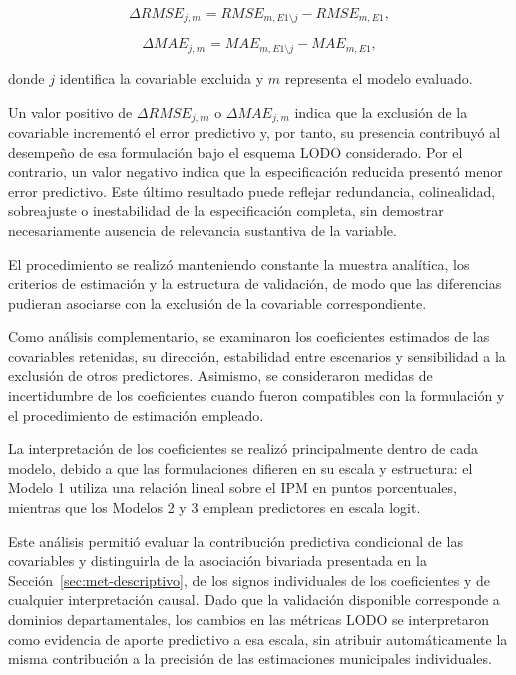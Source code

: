 \begin{equation}
\Delta RMSE_{j,m}
=
RMSE_{m,E1\setminus j}
-
RMSE_{m,E1},
\label{eq:ablacion-rmse}
\end{equation}

\begin{equation}
\Delta MAE_{j,m}
=
MAE_{m,E1\setminus j}
-
MAE_{m,E1},
\label{eq:ablacion-mae}
\end{equation}

donde $j$ identifica la covariable excluida y $m$ representa el modelo evaluado.

Un valor positivo de $\Delta RMSE_{j,m}$ o $\Delta MAE_{j,m}$ indica que la exclusión de la covariable incrementó el error predictivo y, por tanto, su presencia contribuyó al desempeño de esa formulación bajo el esquema LODO considerado. Por el contrario, un valor negativo indica que la especificación reducida presentó menor error predictivo. Este último resultado puede reflejar redundancia, colinealidad, sobreajuste o inestabilidad de la especificación completa, sin demostrar necesariamente ausencia de relevancia sustantiva de la variable.

El procedimiento se realizó manteniendo constante la muestra analítica, los criterios de estimación y la estructura de validación, de modo que las diferencias pudieran asociarse con la exclusión de la covariable correspondiente.

Como análisis complementario, se examinaron los coeficientes estimados de las covariables retenidas, su dirección, estabilidad entre escenarios y sensibilidad a la exclusión de otros predictores. Asimismo, se consideraron medidas de incertidumbre de los coeficientes cuando fueron compatibles con la formulación y el procedimiento de estimación empleado.

La interpretación de los coeficientes se realizó principalmente dentro de cada modelo, debido a que las formulaciones difieren en su escala y estructura: el Modelo 1 utiliza una relación lineal sobre el IPM en puntos porcentuales, mientras que los Modelos 2 y 3 emplean predictores en escala logit.

Este análisis permitió evaluar la contribución predictiva condicional de las covariables y distinguirla de la asociación bivariada presentada en la Sección~\ref{sec:met-descriptivo}, de los signos individuales de los coeficientes y de cualquier interpretación causal. Dado que la validación disponible corresponde a dominios departamentales, los cambios en las métricas LODO se interpretaron como evidencia de aporte predictivo a esa escala, sin atribuir automáticamente la misma contribución a la precisión de las estimaciones municipales individuales.

